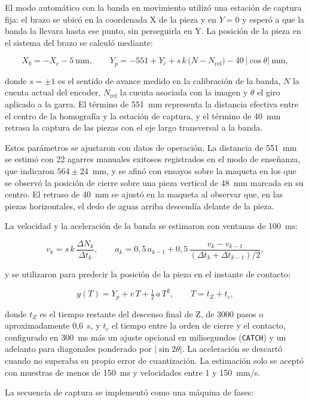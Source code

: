El modo automático con la banda en movimiento utilizó una estación de captura fija: el brazo se ubicó en la coordenada X de la pieza y en $Y=0$ y esperó a que la banda la llevara hasta ese punto, sin perseguirla en Y. La posición de la pieza en el sistema del brazo se calculó mediante:

\[
X_b = -X_c - 5\ \text{mm},
\qquad
Y_p = -551 + Y_c + s\,k\,\bigl(N - N_{\mathrm{ref}}\bigr) - 40\,\lvert\cos\theta\rvert\ \text{mm},
\]

donde $s=\pm1$ es el sentido de avance medido en la calibración de la banda, $N$ la cuenta actual del encoder, $N_{\mathrm{ref}}$ la cuenta asociada con la imagen y $\theta$ el giro aplicado a la garra. El término de 551~mm representa la distancia efectiva entre el centro de la homografía y la estación de captura, y el término de 40~mm retrasa la captura de las piezas con el eje largo transversal a la banda.

Estos parámetros se ajustaron con datos de operación. La distancia de 551~mm se estimó con 22 agarres manuales exitosos registrados en el modo de enseñanza, que indicaron $564\pm24$~mm, y se afinó con ensayos sobre la maqueta en los que se observó la posición de cierre sobre una pieza vertical de 48~mm marcada en su centro. El retraso de 40~mm se ajustó en la maqueta al observar que, en las piezas horizontales, el dedo de aguas arriba descendía delante de la pieza.

La velocidad y la aceleración de la banda se estimaron con ventanas de 100~ms:

\[
v_k = s\,k\,\frac{\Delta N_k}{\Delta t_k},
\qquad
a_k = 0{,}5\,a_{k-1} + 0{,}5\,\frac{v_k - v_{k-1}}{(\Delta t_k + \Delta t_{k-1})/2},
\]

y se utilizaron para predecir la posición de la pieza en el instante de contacto:

\[
y(T) = Y_p + v\,T + \tfrac{1}{2}\,a\,T^2,
\qquad
T = t_Z + t_c,
\]

donde $t_Z$ es el tiempo restante del descenso final de Z, de 3000 pasos o aproximadamente 0,6~s, y $t_c$ el tiempo entre la orden de cierre y el contacto, configurado en 300~ms más un ajuste opcional en milisegundos (\texttt{CATCH}) y un adelanto para diagonales ponderado por $\lvert\sin 2\theta\rvert$. La aceleración se descartó cuando no superaba su propio error de cuantización. La estimación solo se aceptó con muestras de menos de 150~ms y velocidades entre 1 y 150~mm/s.

La secuencia de captura se implementó como una máquina de fases:

